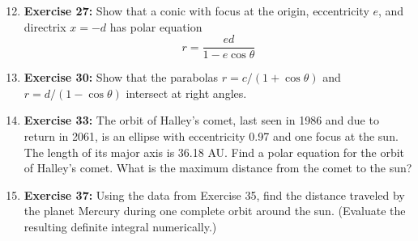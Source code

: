 \documentclass[12pt, a4paper]{article}
\begin{document}
\begin{enumerate}
    \setcounter{enumi}{11}
    \item \textbf{Exercise 27:} Show that a conic with focus at the origin, eccentricity $e$, and directrix $x = -d$ has polar equation
    \[ r = \frac{ed}{1 - e\cos\theta} \]

    \item \textbf{Exercise 30:} Show that the parabolas $r = c/(1 + \cos\theta)$ and $r = d/(1 - \cos\theta)$ intersect at right angles.
    
    \item \textbf{Exercise 33:} The orbit of Halley's comet, last seen in 1986 and due to return in 2061, is an ellipse with eccentricity 0.97 and one focus at the sun. The length of its major axis is 36.18 AU. Find a polar equation for the orbit of Halley's comet. What is the maximum distance from the comet to the sun?

    \item \textbf{Exercise 37:} Using the data from Exercise 35, find the distance traveled by the planet Mercury during one complete orbit around the sun. (Evaluate the resulting definite integral numerically.)
\end{enumerate}
\end{document}
